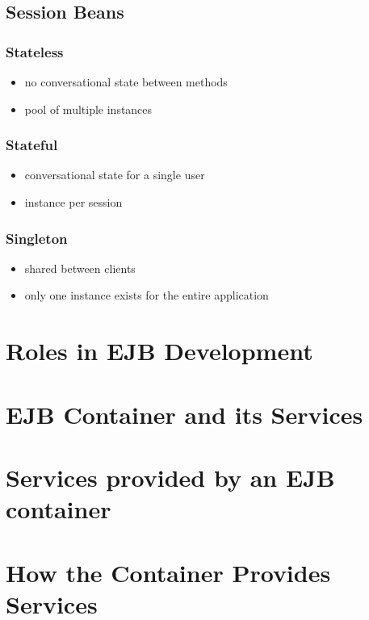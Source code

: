 \subsection{Session Beans}

\subsubsection{Stateless}
\begin{itemize}
	\item no conversational state between methods
	\item pool of multiple instances
\end{itemize}

\subsubsection{Stateful}

\begin{itemize}
	\item conversational state for a single user
	\item instance per session
\end{itemize}

\subsubsection{Singleton}

\begin{itemize}
	\item shared between clients
	\item only one instance exists for the entire application
\end{itemize}

\section{Roles in EJB Development}


\section{EJB Container and its Services}


\section{Services provided by an EJB container}


\section{How the Container Provides Services}


